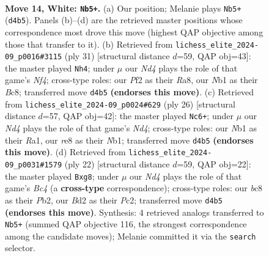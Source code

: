 \documentclass[11pt]{article}
\begin{document}
\clearpage

\begin{figure}[p]\centering
\begin{subfigure}{0.46\textwidth}\centering
\resizebox{\linewidth}{!}{%
\newchessgame
\chessboard[
  setfen={rnb1r3/1pk2ppp/4pn2/p1b5/P2N3P/1B2P3/1P1B1PP1/RN3RK1 w - - 5 14},
  showmover=false,
  pgfstyle=straightmove, color=movearrow, markmove={d4-b5}
]}
\caption{}
\end{subfigure}\hfill
\begin{subfigure}{0.46\textwidth}\centering
\resizebox{\linewidth}{!}{%
\newchessgame
\chessboard[
  setfen={r1b2rk1/pp2bppp/2p5/5n2/1P2N1P1/P3P3/1B2BP1P/R3K2R b KQ - 0 16},
  showmover=false,
  pgfstyle=straightmove, color=movearrow, markmove={f5-h4}
]}
\caption{}
\end{subfigure}
\\[4pt]
\begin{subfigure}{0.46\textwidth}\centering
\resizebox{\linewidth}{!}{%
\newchessgame
\chessboard[
  setfen={r1b4r/3nkppp/pp2p3/2bn4/3N4/1P2P3/P3BPPP/RNBR2K1 w - - 0 14},
  showmover=false,
  pgfstyle=straightmove, color=movearrow, markmove={d4-c6}
]}
\caption{}
\end{subfigure}\hfill
\begin{subfigure}{0.46\textwidth}\centering
\resizebox{\linewidth}{!}{%
\newchessgame
\chessboard[
  setfen={r1b3nr/ppk3pp/2pb1p2/4n3/P1BNPp2/2N5/1PP3PP/R1B2RK1 w - - 2 12},
  showmover=false,
  pgfstyle=straightmove, color=movearrow, markmove={c4-g8}
]}
\caption{}
\end{subfigure}
\caption{\textbf{Move 14, White: \texttt{Nb5+}.} (a) Our position; Melanie plays \texttt{Nb5+} (\texttt{d4b5}). Panels (b)--(d) are the retrieved master positions whose correspondence most drove this move (highest QAP objective among those that transfer to it). (b) Retrieved from \texttt{lichess\_elite\_2024-09\_p0016\#3115} (ply 31) [structural distance $d$=59, QAP obj=43]: the master played \texttt{Nh4}; under $\mu$ our \emph{Nd4} plays the role of that game's \emph{Nf4}; cross-type roles: our \emph{P}f2 as their \emph{R}a8, our \emph{N}b1 as their \emph{B}c8; transferred move \texttt{d4b5} \textbf{(endorses this move)}. (c) Retrieved from \texttt{lichess\_elite\_2024-09\_p0024\#629} (ply 26) [structural distance $d$=57, QAP obj=42]: the master played \texttt{Nc6+}; under $\mu$ our \emph{Nd4} plays the role of that game's \emph{Nd4}; cross-type roles: our \emph{N}b1 as their \emph{R}a1, our \emph{r}e8 as their \emph{N}b1; transferred move \texttt{d4b5} \textbf{(endorses this move)}. (d) Retrieved from \texttt{lichess\_elite\_2024-09\_p0031\#1579} (ply 22) [structural distance $d$=59, QAP obj=22]: the master played \texttt{Bxg8}; under $\mu$ our \emph{Nd4} plays the role of that game's \emph{Bc4} (a \textbf{cross-type} correspondence); cross-type roles: our \emph{b}c8 as their \emph{P}b2, our \emph{B}d2 as their \emph{P}c2; transferred move \texttt{d4b5} \textbf{(endorses this move)}. Synthesis: 4 retrieved analogs transferred to \texttt{Nb5+} (summed QAP objective 116, the strongest correspondence among the candidate moves); Melanie committed it via the \texttt{search} selector.}
\label{fig:thought-m26}
\end{figure}
\end{document}
